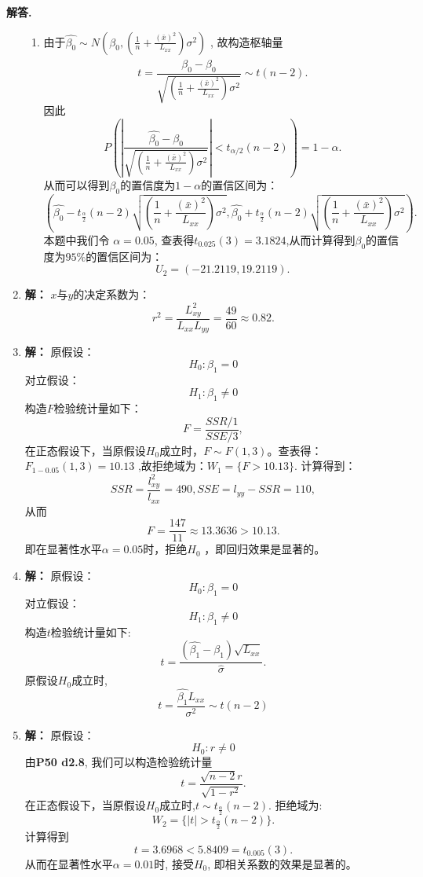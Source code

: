 \documentclass[12pt, a4paper, oneside]{ctexart}
\newenvironment{solution}{\par\noindent\textbf{解答. }}{\par}
\begin{document}
\begin{solution}
\begin{enumerate}
\begin{enumerate}
          	\item {\tt} 由于$\hat{\beta_0}\sim N\left(\beta_0,\left( \frac{1}{n}+ \frac{\left(\bar x\right)^2}{L_{xx}} \right)\sigma^2\right)$
          	, 故构造枢轴量\[ t = \frac{\hat{\beta_0}-\beta_0}{ \sqrt{\left( \frac{1}{n}+ \frac{\left(\bar x\right)^2}{L_{xx}} \right)\sigma^2}} \sim t(n-2).\]
          	因此\[  P\left(\left| \frac{\hat{\beta_0}-\beta_0}{ \sqrt{\left( \frac{1}{n}+ \frac{\left(\bar x\right)^2}{L_{xx}} \right)\sigma^2}} \right|<t_{\alpha/2}(n-2)\right)=1-\alpha.\]
          	从而可以得到$\beta_0$的置信度为$1-\alpha$的置信区间为：
          	\[ \left( \hat{\beta_0}-t_{\frac{\alpha}{2}}(n-2)\sqrt{\left( \frac{1}{n}+ \frac{\left(\bar x\right)^2}{L_{xx}} \right)\sigma^2}, \hat{\beta_0}+t_{\frac{\alpha}{2}}(n-2)\sqrt{\left( \frac{1}{n}+ \frac{\left(\bar x\right)^2}{L_{xx}} \right)\sigma^2}  \right). \]
          	本题中我们令 $\alpha = 0.05$, 查表得$t_{0.025}(3)=3.1824$,从而计算得到$\beta_0$的置信度为$95\%$的置信区间为：
          	\[U_2 = (-21.2119,19.2119). \]
        \end{enumerate}
        
        \item {\tt}    {\bf 解：} 
               $x$与$y$的决定系数为：
               \[ r^2 = \frac{L_{xy}^2}{L_{xx}L_{yy}} = \frac{49}{60} \approx 0.82.\]
               
        \item {\tt}    {\bf 解：} 
        原假设：\[ H_0 : \beta_1 = 0 \]
        对立假设： \[ H_1 : \beta_1 \neq 0 \]
        构造$F$检验统计量如下：\[ F=\frac{SSR / 1}{SSE / 3}, \]在正态假设下，当原假设$H_0$成立时，$F \sim F(1,3)$。查表得：$F_{1-0.05}(1,3)=10.13$ ,故拒绝域为：$ W_1 = \{ F>10.13\} . $
        计算得到：
        \[ SSR = \frac{l_{xy}^2}{l_{xx}}=490, SSE = l_{yy} - SSR = 110 ,\]
        从而
        \[ F =  \frac{147}{11} \approx 13.3636  >10.13.\]
        即在显著性水平$ \alpha = 0.05 $时，拒绝$ H_0 $ ，即回归效果是显著的。
        
        \item {\tt}    {\bf 解：} 
        原假设：\[ H_0 : \beta_1 = 0 \]
        对立假设： \[ H_1 : \beta_1 \neq 0 \]
        构造$t$检验统计量如下:\[ t = \frac{\left(\hat{\beta_1}-\beta_1\right)\sqrt{L_{xx}}}{\hat{\sigma}} . \]
        原假设$H_0$成立时, \[ t = \frac{\hat{\beta_1}L_{xx}}{\sigma^2}\sim t(n-2) \]
       
        \item {\tt}    {\bf 解：}
        原假设：\[ H_0 : r \neq 0 \]
        由\textbf{P50 d2.8}, 我们可以构造检验统计量\[ t = \frac{ \sqrt{n-2}r }{ \sqrt{1 - r^2 }} . \]
        在正态假设下，当原假设$H_0$成立时,$t \sim t_{\frac{\alpha}{2}}(n-2).$
        拒绝域为: \[W_2=  \{|t|> t_{\frac{\alpha}{2}}(n-2) \} .\] 
        计算得到\[ t = 3.6968 < 5.8409 = t_{0.005}(3).\]
        从而在显著性水平$ \alpha = 0.01 $时, 接受$ H_0 $, 即相关系数的效果是显著的。
        

\end{enumerate}
\end{solution}
\end{document}
